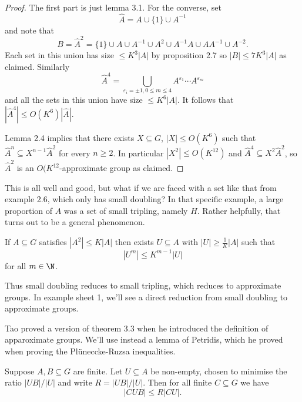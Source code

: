 \documentclass[a4paper]{article}
\begin{document}
\begin{proof}
  The first part is just lemma 3.1. For the converse, set
  \[
    \hat A = A \cup \{1\} \cup A^{-1}
  \]
  and note that
  \[
    B = \hat A^2 = \{1\} \cup A \cup A^{-1} \cup A^2 \cup A^{-1}A \cup AA^{-1} \cup A^{-2}.
  \]
  Each set in this union has size \(\leq K^3 |A|\) by proposition 2.7 so \(|B| \leq 7K^3|A|\) as claimed. Similarly
  \[
    \hat A^4 = \bigcup_{\varepsilon_i = \pm 1, 0 \leq m \leq 4} A^{\varepsilon_1} \cdots A^{\varepsilon_m}
  \]
  and all the sets in this union have size \(\leq K^6 |A|\). It follows that \(|\hat A^4| \leq O(K^6) |\hat A|\).

  Lemma 2.4 implies that there exists \(X \subseteq G\), \(|X| \leq O(K^6)\) such that \(\hat A^n \subseteq X^{n - 1} \hat A^2\) for every \(n \geq 2\). In particular \(|X^2| \leq O(K^{12})\) and \(\hat A^4 \subseteq X^2 \hat A^2\), so \(\hat A^2\) is an \(O(K^{12}\)-approximate group as claimed.
\end{proof}

This is all well and good, but what if we are faced with a set like that from example 2.6, which only has small doubling? In that specific example, a large proportion of \(A\) was a set of small tripling, namely \(H\). Rather helpfully, that turns out to be a general phenomenon.

\begin{theorem}[theorem 3.3]
  If \(A \subseteq G\) satisfies \(|A^2| \leq K|A|\) then exists \(U \subseteq A\) with \(|U| \geq \frac{1}{K}|A|\) such that
  \[
    |U^m| \leq K^{m - 1}|U|
  \]
  for all \(m \in \N\).
\end{theorem}

Thus small doubling reduces to small tripling, which reduces to approximate groups. In example sheet 1, we'll see a direct reduction from small doubling to approximate groups.

Tao proved a version of theorem 3.3 when he introduced the definition of apparoximate groups. We'll use instead a lemma of Petridis, which he proved when proving the Plüneccke-Ruzsa inequalities.

\begin{lemma}[lemma 3.4][Petridis]
  Suppose \(A, B \subseteq G\) are finite. Let \(U \subseteq A\) be non-empty, chosen to minimise the ratio \(|UB|/|U|\) and write \(R = |UB|/|U|\). Then for all finite \(C \subseteq G\) we have
  \[
    |CUB| \leq R |CU|.
  \]
\end{lemma}
\end{document}
